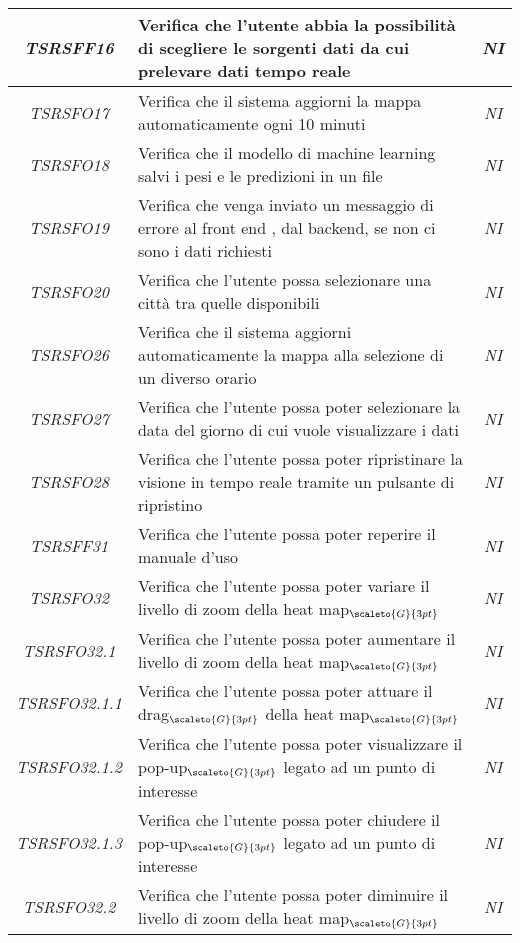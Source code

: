 {\begin{center}
\begin{tabularx}{\textwidth}{|c|X|c|}
			\hline
			\textit{TSRSFF16} & Verifica che l’utente abbia la possibilità di scegliere le sorgenti dati da cui prelevare dati tempo reale & \textit{NI}\\
			\hline
			\textit{TSRSFO17} & Verifica che il sistema aggiorni la mappa automaticamente ogni 10 minuti & \textit{NI}\\
			\hline
			\textit{TSRSFO18} & Verifica che il modello di machine learning salvi i pesi e le predizioni in un file & \textit{NI}\\
			\hline
			\textit{TSRSFO19} & Verifica che venga inviato un messaggio di errore al front end , dal backend, se non ci sono i dati richiesti & \textit{NI}\\
			\hline
			\textit{TSRSFO20} & Verifica che l’utente possa selezionare una città tra quelle disponibili & \textit{NI}\\
			\hline
			\textit{TSRSFO26} & Verifica che il sistema aggiorni automaticamente la mappa alla selezione di un diverso orario & \textit{NI}\\
			\hline
			\textit{TSRSFO27} & Verifica che l’utente possa poter selezionare la data del giorno di cui vuole visualizzare i dati & \textit{NI}\\
			\hline
			\textit{TSRSFO28} & Verifica che l’utente possa poter ripristinare la visione in tempo reale tramite un pulsante di ripristino & \textit{NI}\\
			\hline
			\textit{TSRSFF31} & Verifica che l’utente possa poter reperire il manuale d'uso & \textit{NI}\\
			\hline
			\textit{TSRSFO32} & Verifica che l’utente possa poter variare il livello di zoom della heat map$_{\scaleto{G}{3pt}}$ & \textit{NI}\\
			\hline
			\textit{TSRSFO32.1} & Verifica che l’utente possa poter aumentare il livello di zoom della heat map$_{\scaleto{G}{3pt}}$ & \textit{NI}\\
			\hline
			\textit{TSRSFO32.1.1} & Verifica che l’utente possa poter attuare il drag$_{\scaleto{G}{3pt}}$ della heat map$_{\scaleto{G}{3pt}}$ & \textit{NI}\\
			\hline
			\textit{TSRSFO32.1.2} & Verifica che l’utente possa poter visualizzare il pop-up$_{\scaleto{G}{3pt}}$ legato ad un punto di interesse & \textit{NI}\\
			\hline
			\textit{TSRSFO32.1.3} & Verifica che l’utente possa poter chiudere il pop-up$_{\scaleto{G}{3pt}}$ legato ad un punto di interesse & \textit{NI}\\
			\hline
			\textit{TSRSFO32.2} & Verifica che l’utente possa poter diminuire il livello di zoom della heat map$_{\scaleto{G}{3pt}}$ & \textit{NI}\\

\end{tabularx}
\end{center}}
